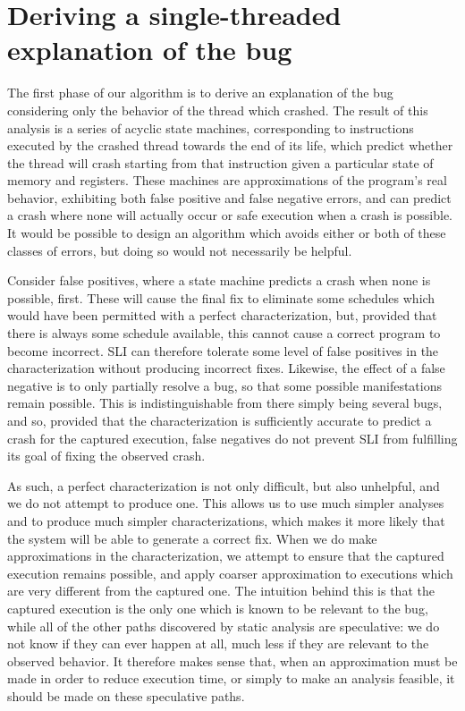 \documentclass[10pt,twocolumn,preprint,natbib,authoryear]{sigplanconf}
\newcommand{\editorial}[1]{}
\begin{document}
\section{Deriving a single-threaded explanation of the bug}
\label{sect:build_state_machines}

The first phase of our algorithm is to derive an explanation of the
bug considering only the behavior of the thread which crashed.  The
result of this analysis is a series of acyclic state machines,
corresponding to instructions executed by the crashed thread towards
the end of its life, which predict whether the thread will crash
starting from that instruction given a particular state of memory and
registers.  These machines are approximations of the program's real
behavior, exhibiting both false positive and false negative errors,
and can predict a crash where none will actually occur or safe
execution when a crash is possible.  It would be possible to design an
algorithm which avoids either or both of these classes of errors, but
doing so would not necessarily be helpful.

Consider false positives, where a state machine predicts a crash when
none is possible, first.  These will cause the final fix to eliminate
some schedules which would have been permitted with a perfect
characterization, but, provided that there is always some schedule
available, this cannot cause a correct program to become incorrect.
SLI can therefore tolerate some level of false positives in the
characterization without producing incorrect fixes.  Likewise, the
effect of a false negative is to only partially resolve a bug, so that
some possible manifestations remain possible.  This is
indistinguishable from there simply being several bugs, and so,
provided that the characterization is sufficiently accurate to predict
a crash for the captured execution, false negatives do not prevent SLI
from fulfilling its goal of fixing the observed crash.\editorial{Feels
  glib.}

As such, a perfect characterization is not only difficult, but also
unhelpful, and we do not attempt to produce one.  This allows us to
use much simpler analyses and to produce much simpler
characterizations, which makes it more likely that the system will be
able to generate a correct fix.  When we do make approximations in the
characterization, we attempt to ensure that the captured execution
remains possible, and apply coarser approximation to executions which
are very different from the captured one.  The intuition behind this
is that the captured execution is the only one which is known to be
relevant to the bug, while all of the other paths discovered by static
analysis are speculative: we do not know if they can ever happen at
all, much less if they are relevant to the observed behavior.  It
therefore makes sense that, when an approximation must be made in
order to reduce execution time, or simply to make an analysis
feasible, it should be made on these speculative paths.
\end{document}
